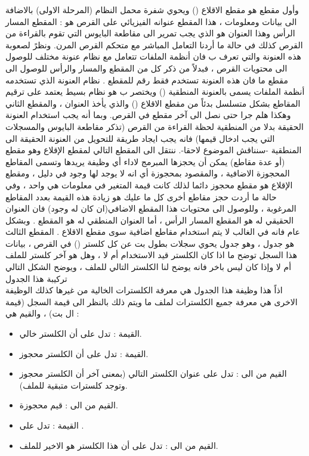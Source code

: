\documentclass[document.tex]{subfiles}
\begin{document}
وأول مقطع هو مقطع الاقلاع () ويحوي شفرة محمل النظام (المرحلة الاولى) بالاضافة الى بيانات ومعلومات  ، هذا المقطع عنوانه الفيزيائي على القرص هو : المقطع  المسار  الرأس  وهذا العنوان هو الذي يجب تمرير الى مقاطعة البايوس  التي تقوم بالقراءة من القرص كذلك في حالة ما أردنا التعامل المباشر مع متحكم القرص المرن.
ونظرً لصعوبة هذه العنونة والتي تعرف ب  فان أنظمة الملفات تتعامل مع نظام عنونة مختلف للوصول الى محتويات القرص ، فبدلاً من ذكر كل من المقطع والمسار والرأس للوصول الى مقطع ما فان هذه العنونة تستخدم فقط رقم للمقطع .
نظام العنونة الذي تستخدمه أنظمة الملفات يسمى بالعنونة المنطقية () ويختصر ب  هو نظام بسيط يعتمد على ترقيم المقاطع بشكل متسلسل بدئاً من مقطع الاقلاع () والذي يأخذ العنوان  ، والمقطع الثاني  وهكذا هلم جرا حتى نصل الى آخر مقطع في القرص. وبما أنه يجب استخدام العنونة الحقيقة بدلا من المنطقية لحظة القراءة من القرص (تذكر مقاطعة البايوس  والمسجلات التي يجب ادخال قيمها) فانه يجب ايجاد طريقة للتحويل من العنونة الحقيقة الى المنطقية -سنناقش الموضوع لاحقا-.
ننتقل الى المقطع التالي لمقطع الإقلاع وهو مقطع (أو عدة مقاطع) يمكن أن يحجزها المبرمج لاداء أي وظيفة يريدها وتسمى المقاطع المحجوزة الاضافية  ، والمقصود بمحجوزة أي انه لا يوجد لها وجود في دليل  ، ومقطع الإقلاع هو مقطع محجوز دائما لذلك كانت قيمة المتغير   في معلومات  هي واحد ، وفي حالة ما أردت حجز مقاطع أخرى كل ما عليك هو زيادة هذه القيمة بعدد المقاطع المرغوبة ، وللوصول الى محتويات هذا المقطع الاضافي(ان كان له وجود) فان العنوان الحقيقي له هو المقطع  المسار  الرأس  ، أما العنوان المنطقي له هو المقطع . وبشكل عام فانه في الغالب لا يتم استخدام مقاطع اضافية سوى مقطع الاقلاع .
المقطع الثالث هو جدول  ، وهو جدول يحوي سجلات بطول  بت عن كل كلستر () في القرص ، بيانات هذا السجل توضح ما اذا كان الكلستر قيد الاستخدام أم لا ، وهل هو آخر كلستر للملف أم لا وإذا كان ليس باخر فانه يوضح لنا الكلستر التالي للملف ، ويوضح الشكل التالي تركيبة هذا الجدول\\

اذاً هذا وظيفة هذا الجدول هي معرفة الكلسترات الخالية من غيرها كذلك الوظيفة الاخرى هي معرفة جميع الكلسترات لملف ما ويتم ذلك بالنظر الى قيمة السجل (قيمة ال  بت) ، والقيم هي :

\begin{itemize}
\item القيمة : تدل على أن الكلستر خالي.
\item القيمة  : تدل على أن الكلستر محجوز.
\item القيم من  الى  : تدل على عنوان الكلستر التالي (بمعنى آخر أن الكلستر محجوز وتوجد كلسترات متبقية للملف).
\item القيم من  الى : قيم محجوزة.
\item القيمة  : تدل على .
\item القيم من  الى : تدل على أن هذا الكلستر هو الاخير للملف. 

\end{itemize}
\end{document}
